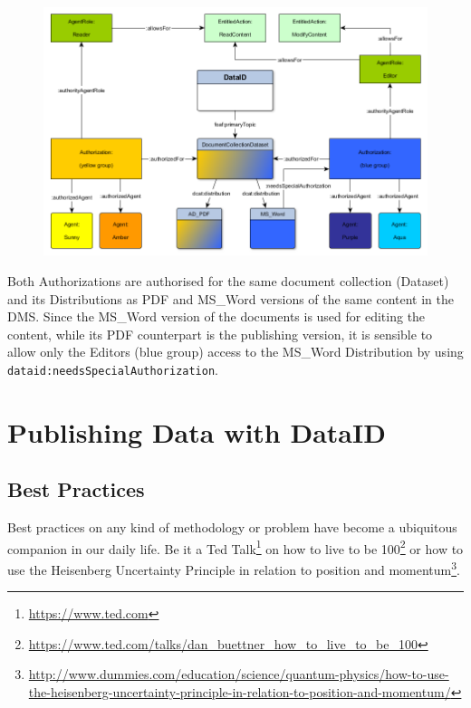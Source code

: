 \documentclass[a4paper,english,twoside,BCOR1.5cm,headsepline,DIV12,appendixprefix,final,12pt]{scrbook}
\newcommand{\prop}[1]{{{\texttt{#1}}}}
\newcommand\footnoteurl[1]{\footnote{\scriptsize\url{#1}}}
\begin{document}
\begin{figure}[!htbp]
\centering
  \includegraphics[width=\textwidth]{images/DmsExample.png}
  \label{fig:dlaxioms}
\end{figure}

Both Authorizations are authorised for the same document collection (Dataset) and its Distributions as PDF and MS\_Word versions of the same content in the DMS. Since the MS\_Word version of the documents is used for editing the content, while its PDF counterpart is the publishing version, it is sensible to allow only the Editors (blue group) access to the MS\_Word Distribution by using \prop{dataid:needsSpecialAuthorization}. 

\chapter{Publishing Data with DataID}
\label{chap:bestprctice}

\section{Best Practices} 
\label{sec:bestprctice}
Best practices on any kind of methodology or problem have become a ubiquitous companion in our daily life. Be it a Ted Talk\footnoteurl{https://www.ted.com} on how to live to be 100\footnoteurl{https://www.ted.com/talks/dan_buettner_how_to_live_to_be_100} or how to use the Heisenberg Uncertainty Principle in relation to position and momentum\footnoteurl{http://www.dummies.com/education/science/quantum-physics/how-to-use-the-heisenberg-uncertainty-principle-in-relation-to-position-and-momentum/}.
\end{document}

